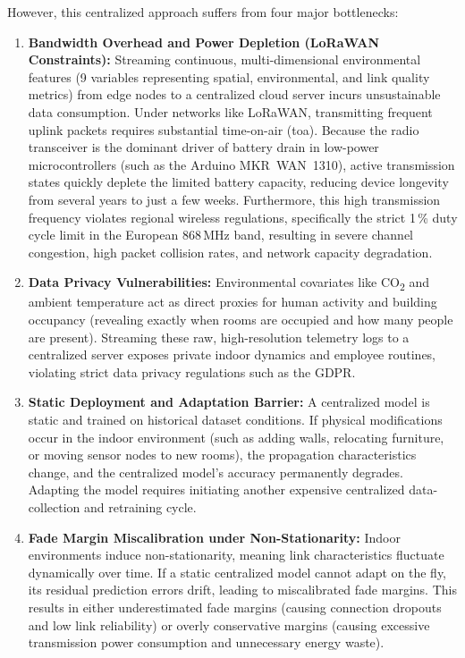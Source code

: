 However, this centralized approach suffers from four major bottlenecks:
\begin{enumerate}
  \item \textbf{Bandwidth Overhead and Power Depletion (LoRaWAN Constraints):} Streaming continuous, multi-dimensional environmental features (9 variables representing spatial, environmental, and link quality metrics) from edge nodes to a centralized cloud server incurs unsustainable data consumption. Under networks like LoRaWAN, transmitting frequent uplink packets requires substantial time-on-air (\gls{toa}). Because the radio transceiver is the dominant driver of battery drain in low-power microcontrollers (such as the Arduino MKR~WAN~1310), active transmission states quickly deplete the limited battery capacity, reducing device longevity from several years to just a few weeks. Furthermore, this high transmission frequency violates regional wireless regulations, specifically the strict 1\,\% duty cycle limit in the European 868\,MHz band, resulting in severe channel congestion, high packet collision rates, and network capacity degradation.
  \item \textbf{Data Privacy Vulnerabilities:} Environmental covariates like CO\textsubscript{2} and ambient temperature act as direct proxies for human activity and building occupancy (revealing exactly when rooms are occupied and how many people are present). Streaming these raw, high-resolution telemetry logs to a centralized server exposes private indoor dynamics and employee routines, violating strict data privacy regulations such as the GDPR.
  \item \textbf{Static Deployment and Adaptation Barrier:} A centralized model is static and trained on historical dataset conditions. If physical modifications occur in the indoor environment (such as adding walls, relocating furniture, or moving sensor nodes to new rooms), the propagation characteristics change, and the centralized model's accuracy permanently degrades. Adapting the model requires initiating another expensive centralized data-collection and retraining cycle.
  \item \textbf{Fade Margin Miscalibration under Non-Stationarity:} Indoor environments induce non-stationarity, meaning link characteristics fluctuate dynamically over time. If a static centralized model cannot adapt on the fly, its residual prediction errors drift, leading to miscalibrated fade margins. This results in either underestimated fade margins (causing connection dropouts and low link reliability) or overly conservative margins (causing excessive transmission power consumption and unnecessary energy waste).
\end{enumerate}

